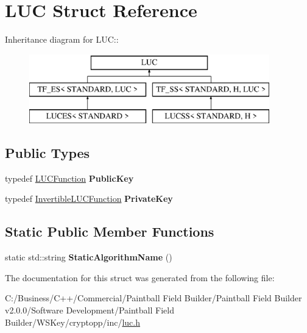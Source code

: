 \hypertarget{struct_l_u_c}{
\section{LUC Struct Reference}
\label{struct_l_u_c}
}
Inheritance diagram for LUC::\begin{figure}[H]
\begin{center}
\leavevmode
\includegraphics[height=3cm]{struct_l_u_c}
\end{center}
\end{figure}
\subsection*{Public Types}
\begin{DoxyCompactItemize}
\item 
\hypertarget{struct_l_u_c_a00c58dc85304fd8c2e9fe7294abf4061}{
typedef \hyperlink{class_l_u_c_function}{LUCFunction} {\bfseries PublicKey}}
\label{struct_l_u_c_a00c58dc85304fd8c2e9fe7294abf4061}

\item 
\hypertarget{struct_l_u_c_a762ef7ddb96c7d9f52bcde021a67b9dd}{
typedef \hyperlink{class_invertible_l_u_c_function}{InvertibleLUCFunction} {\bfseries PrivateKey}}
\label{struct_l_u_c_a762ef7ddb96c7d9f52bcde021a67b9dd}

\end{DoxyCompactItemize}
\subsection*{Static Public Member Functions}
\begin{DoxyCompactItemize}
\item 
\hypertarget{struct_l_u_c_acd500e86ed4e72906f66fc424cb81a81}{
static std::string {\bfseries StaticAlgorithmName} ()}
\label{struct_l_u_c_acd500e86ed4e72906f66fc424cb81a81}

\end{DoxyCompactItemize}


The documentation for this struct was generated from the following file:\begin{DoxyCompactItemize}
\item 
C:/Business/C++/Commercial/Paintball Field Builder/Paintball Field Builder v2.0.0/Software Development/Paintball Field Builder/WSKey/cryptopp/inc/\hyperlink{luc_8h}{luc.h}\end{DoxyCompactItemize}
